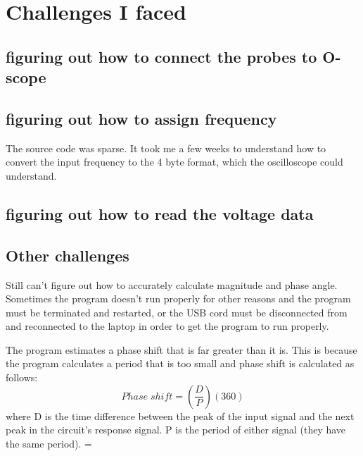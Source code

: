 \chapter{Challenges I faced}
\section{figuring out how to connect the probes to O-scope}
\section{figuring out how to assign frequency}
The source code was sparse. It took me a few weeks to understand how to convert the input frequency to the 4 byte format, which the oscilloscope could understand.
\section{figuring out how to read the voltage data}
\section{Other challenges}
 Still can't figure out how to accurately calculate magnitude and phase angle. Sometimes the program doesn't run properly for other reasons and the program must be terminated and restarted, or the USB cord must be disconnected from and reconnected to the laptop in order to get the program to run properly.

The program estimates a phase shift that is far greater than it is. This is because the program calculates a period that is too small and phase shift is calculated as follows:
\begin{equation}
Phase\;shift =(\frac{D}{P})(360)
\end{equation}
where D is the time difference between the peak of the input signal and the next peak in the circuit's response signal. P is the period of either signal (they have the same period).
=%
